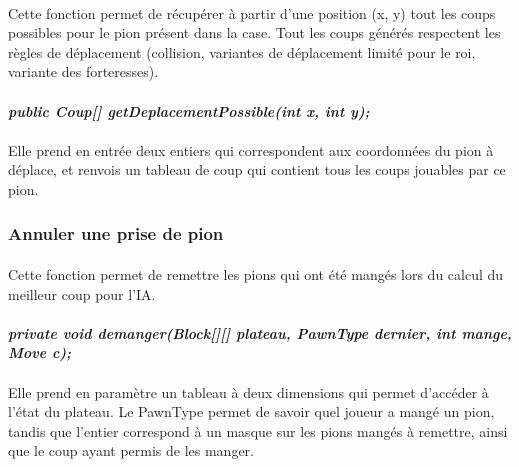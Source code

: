 \documentclass[11pt]{article} %
\begin{document}
\paragraph{}
Cette fonction permet de récupérer à partir d'une position (x, y) tout les coups possibles pour le pion présent dans la case. Tout les coups générés respectent les règles de déplacement (collision, variantes de déplacement limité pour le roi, variante des forteresses).
\paragraph{}
\textit{\textbf{public Coup[] getDeplacementPossible(int x, int y);}}
\paragraph{}
Elle prend en entrée deux entiers qui correspondent  aux coordonnées du pion à déplace, et renvois un tableau de coup qui contient tous les coups jouables par ce pion.

\subsubsection{Annuler une prise de pion}
\paragraph{}
Cette fonction permet de remettre les pions qui ont été mangés lors du calcul du meilleur coup pour l'IA.
\paragraph{}
\textit{\textbf{private void demanger(Block[][] plateau, PawnType dernier, int mange, Move c);}}
\paragraph{}
Elle prend en paramètre un tableau à deux dimensions qui permet d'accéder à l'état du plateau. Le PawnType permet de savoir quel joueur a mangé un pion, tandis que l'entier correspond à un masque sur les pions mangés à remettre, ainsi que le coup ayant permis de les manger.
\end{document}
